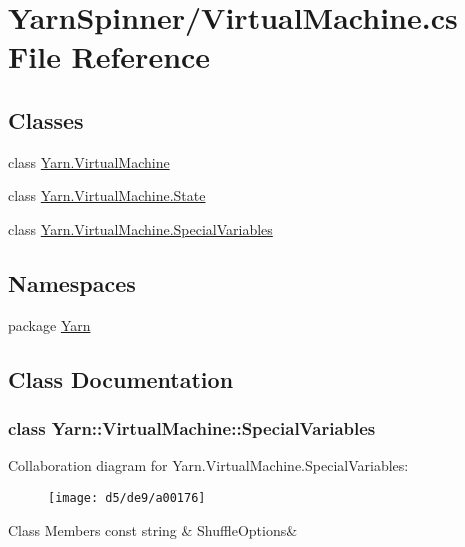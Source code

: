 \hypertarget{a00130}{\section{Yarn\-Spinner/\-Virtual\-Machine.cs File Reference}
\label{a00130}
}
\subsection*{Classes}
\begin{DoxyCompactItemize}
\item 
class \hyperlink{a00072}{Yarn.\-Virtual\-Machine}
\item 
class \hyperlink{a00075}{Yarn.\-Virtual\-Machine.\-State}
\item 
class \hyperlink{a00072_d0/d48/a00165}{Yarn.\-Virtual\-Machine.\-Special\-Variables}
\end{DoxyCompactItemize}
\subsection*{Namespaces}
\begin{DoxyCompactItemize}
\item 
package \hyperlink{a00026}{Yarn}
\end{DoxyCompactItemize}


\subsection{Class Documentation}
\label{d0/d48/a00165}
\hypertarget{a00072_d0/d48/a00165}{}
\subsubsection{class Yarn\-:\-:Virtual\-Machine\-:\-:Special\-Variables}


Collaboration diagram for Yarn.\-Virtual\-Machine.\-Special\-Variables\-:
\nopagebreak
\begin{figure}[H]
\begin{center}
\leavevmode
\texttt{[image: d5/de9/a00176]}
\end{center}
\end{figure}
\begin{DoxyFields}{Class Members}
\hypertarget{a00072_aecbb8ab9becd96457d836100b2818078}{const string}\label{a00072_aecbb8ab9becd96457d836100b2818078}
&
Shuffle\-Options&
\\
\hline

\end{DoxyFields}
